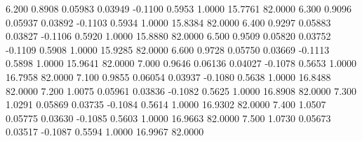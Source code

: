    6.200   0.8908   0.05983   0.03949  -0.1100   0.5953   1.0000  15.7761  82.0000
   6.300   0.9096   0.05937   0.03892  -0.1103   0.5934   1.0000  15.8384  82.0000
   6.400   0.9297   0.05883   0.03827  -0.1106   0.5920   1.0000  15.8880  82.0000
   6.500   0.9509   0.05820   0.03752  -0.1109   0.5908   1.0000  15.9285  82.0000
   6.600   0.9728   0.05750   0.03669  -0.1113   0.5898   1.0000  15.9641  82.0000
   7.000   0.9646   0.06136   0.04027  -0.1078   0.5653   1.0000  16.7958  82.0000
   7.100   0.9855   0.06054   0.03937  -0.1080   0.5638   1.0000  16.8488  82.0000
   7.200   1.0075   0.05961   0.03836  -0.1082   0.5625   1.0000  16.8908  82.0000
   7.300   1.0291   0.05869   0.03735  -0.1084   0.5614   1.0000  16.9302  82.0000
   7.400   1.0507   0.05775   0.03630  -0.1085   0.5603   1.0000  16.9663  82.0000
   7.500   1.0730   0.05673   0.03517  -0.1087   0.5594   1.0000  16.9967  82.0000
